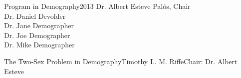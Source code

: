 





{Program in Demography}{2013}
{Dr. Albert Esteve Pal\'{o}s, Chair\\
 Dr. Daniel Devolder\\
 Dr. Jane Demographer\\
 Dr. Joe Demographer\\
 Dr. Mike Demographer}

\initializefrontsections



\makeatletter
\if@twoside \setcounter{page}{4} \else \setcounter{page}{1} \fi
\makeatother
 

\startacknowledgementspage

\label{Acknowledgements}

%

\tableofcontents      %
\listoffigures        %
\listoftables        %

\startabstractpage
{The Two-Sex Problem in Demography}{Timothy L. M. Riffe}{Chair: Dr. Albert Esteve}

\label{Abstract}

